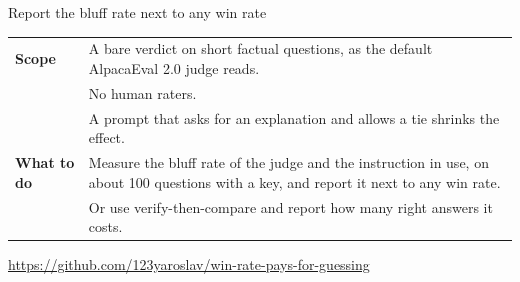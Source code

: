 \documentclass[14pt,aspectratio=169,t]{beamer}
\begin{document}
\begin{frame}{Report the bluff rate next to any win rate}
\begin{tabular}{@{}>{\bfseries}p{28mm}>{\raggedright\arraybackslash}p{107mm}@{}}
Scope & A bare verdict on short factual questions, as the default AlpacaEval 2.0 judge reads. \\[1mm]
 & No human raters. \\[0.5mm]
 & A prompt that asks for an explanation and allows a tie shrinks the effect. \\[1mm]
What to do & Measure the bluff rate of the judge and the instruction in use, on about 100 questions with a key, and report it next to any win rate. \\[1mm]
 & Or use verify-then-compare and report how many right answers it costs. \\
\end{tabular}\par
\vspace{1mm}
\url{https://github.com/123yaroslav/win-rate-pays-for-guessing}
\end{frame}
\end{document}
